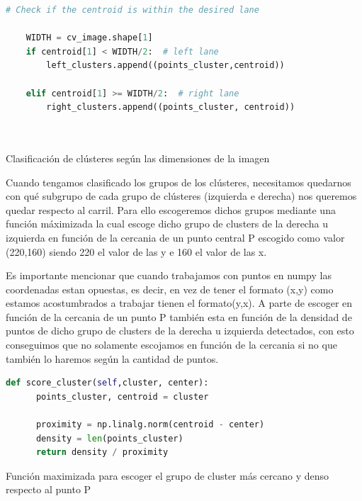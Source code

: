 \begin{code}[h]
  \begin{lstlisting}[language=Python]
    # Check if the centroid is within the desired lane

    WIDTH = cv_image.shape[1]
    if centroid[1] < WIDTH/2:  # left lane
        left_clusters.append((points_cluster,centroid))
       
    elif centroid[1] >= WIDTH/2:  # right lane
        right_clusters.append((points_cluster, centroid))
       
  
  \end{lstlisting}
  \caption[Clasificación de clústeres según las dimensiones de la imagen ]{Clasificación de clústeres según las dimensiones de la imagen}
  \label{cod:codejemplo}
  \end{code}  


Cuando tengamos clasificado los grupos de los clústeres, necesitamos quedarnos con qué subgrupo de cada grupo de clústeres (izquierda e derecha) nos queremos quedar respecto al carril. Para ello escogeremos dichos grupos mediante una función máximizada
la cual escoge dicho grupo de clusters de la derecha u izquierda en función de la cercania de un punto central P escogido como valor (220,160) siendo 220 el valor de las y e 160 el valor de las x. \newline

Es importante mencionar que cuando trabajamos con puntos en numpy las coordenadas estan opuestas, es decir, en vez de tener el formato (x,y) como estamos acostumbrados a trabajar tienen el formato(y,x). A parte de escoger en función de la cercania de un punto P también esta en función de la densidad de puntos de dicho grupo de clusters de la derecha u izquierda detectados, con
esto conseguimos que no solamente escojamos en función de la cercania si no que también lo haremos según la cantidad de puntos. \newline

\begin{code}[h]
  \begin{lstlisting}[language=Python]
    def score_cluster(self,cluster, center):
      points_cluster, centroid = cluster
    
      proximity = np.linalg.norm(centroid - center)
      density = len(points_cluster)
      return density / proximity

  \end{lstlisting}
  \caption[Función maximizada para escoger el grupo de cluster más cercano y denso respecto al punto P]{Función maximizada para escoger el grupo de cluster más cercano y denso respecto al punto P}
  \label{cod:codejemplo}
  \end{code}  

